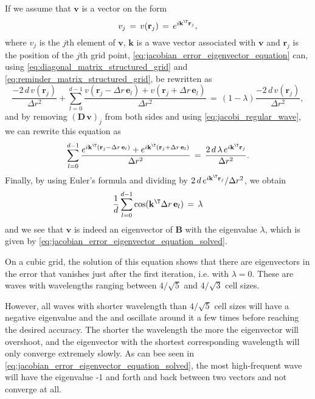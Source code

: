 If we assume that $\mathbf{v}$ is a vector on the form
%
\begin{equation} \label{eq:jacobi_regular_wave}
v_j \,=\, v(\mathbf{r}_j) \,=\, e^{i\mathbf{k}^{\T}\mathbf{r}_j},
\end{equation}
%
where $v_j$ is the $j$th element of $\mathbf{v}$, $\mathbf{k}$ is a wave vector associated with $\mathbf{v}$ and $\mathbf{r}_j$ is the position of the $j$th grid point, \eqref{eq:jacobian_error_eigenvector_equation} can, using \eqref{eq:diagonal_matrix_structured_grid} and \eqref{eq:reminder_matrix_structured_grid}, be rewritten as
%
\begin{equation} \label{eq:jacobian_error_eigenvector_equation_discretized}
\frac{-2\,d\,v(\mathbf{r}_j)}{\Delta r^2} + \sum_{l=0}^{d-1} \frac{v(\mathbf{r}_j-\Delta r\,\mathbf{e}_l)+v(\mathbf{r}_j+\Delta r\,\mathbf{e}_l)}{\Delta r^2} \,=\, (1-\lambda)\frac{-2\,d\,v(\mathbf{r}_j)}{\Delta r^2},
\end{equation}
%
and by removing $(\mathbf{D}\,\mathbf{v})_j$ from both sides and using \eqref{eq:jacobi_regular_wave}, we can rewrite this equation as
%
\begin{equation} \label{eq:jacobian_error_eigenvector_equation_discretized_and_siplified}
\sum_{l=0}^{d-1} \frac{e^{i\mathbf{k}^{\T}(\mathbf{r}_j-\Delta r\,\mathbf{e}_l)}+e^{i\mathbf{k}^{\T}(\mathbf{r}_j+\Delta r\,\mathbf{e}_l)}}{\Delta r^2} \,=\, \frac{2\,d\,\lambda\,e^{i\mathbf{k}^{\T}\mathbf{r}_j}}{\Delta r^2}.
\end{equation}
%
Finally, by using Euler's formula and dividing by $2\,d\,e^{i\mathbf{k}^{\T}\mathbf{r}_j}/\Delta r^2$, we obtain
%
\begin{equation} \label{eq:jacobian_error_eigenvector_equation_solved}
\frac{1}{d}\sum_{l=0}^{d-1} \cos(\mathbf{k}^{\T}\Delta r\,\mathbf{e}_l) \,=\, \lambda
\end{equation}
%
and we see that $\mathbf{v}$ is indeed an eigenvector of $\mathbf{B}$ with the eigenvalue $\lambda$, which is given by \eqref{eq:jacobian_error_eigenvector_equation_solved}.

On a cubic grid, the solution of this equation shows that there are eigenvectors in the error that vanishes just after the first iteration, i.e. with $\lambda = 0$. These are waves with wavelengths ranging between $4/\sqrt{5}$ and $4/\sqrt{3}$ cell sizes.

However, all waves with shorter wavelength than $4/\sqrt{5}$ cell sizes will have a negative eigenvalue and \overshoot the  and oscillate around it a few times before reaching the desired accuracy. The shorter the wavelength the more the eigenvector will overshoot, and the eigenvector with the shortest corresponding wavelength will only converge extremely slowly. As can bee seen in \eqref{eq:jacobian_error_eigenvector_equation_solved}, the most high-frequent wave will have the eigenvalue -1 and \oscillate forth and back between two vectors and not converge at all.


